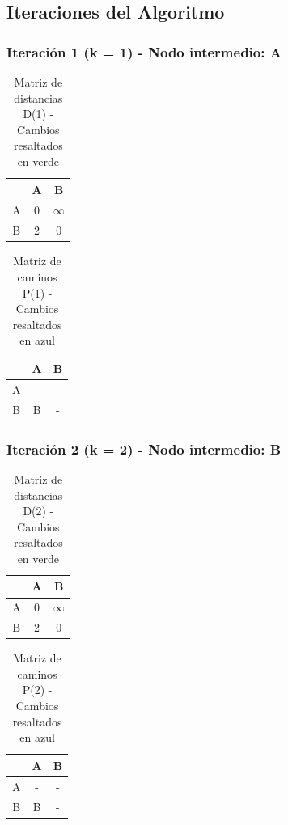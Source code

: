 \documentclass[12pt]{article}
\begin{document}
\clearpage
\subsection{Iteraciones del Algoritmo}
\subsubsection{Iteración 1 (k = 1) - Nodo intermedio: A}
\begin{table}[h!]
\centering
\begin{tabular}{|c|c|c|}
\hline
 & A & B \\\hline
A & 0 & $\infty$ \\\hline
B & 2 & 0 \\\hline
\end{tabular}
\caption{Matriz de distancias D(1) - Cambios resaltados en verde}
\end{table}

\begin{table}[h!]
\centering
\begin{tabular}{|c|c|c|}
\hline
 & A & B \\\hline
A & - & - \\\hline
B & B & - \\\hline
\end{tabular}
\caption{Matriz de caminos P(1) - Cambios resaltados en azul}
\end{table}

\subsubsection{Iteración 2 (k = 2) - Nodo intermedio: B}
\begin{table}[h!]
\centering
\begin{tabular}{|c|c|c|}
\hline
 & A & B \\\hline
A & 0 & $\infty$ \\\hline
B & 2 & 0 \\\hline
\end{tabular}
\caption{Matriz de distancias D(2) - Cambios resaltados en verde}
\end{table}

\begin{table}[h!]
\centering
\begin{tabular}{|c|c|c|}
\hline
 & A & B \\\hline
A & - & - \\\hline
B & B & - \\\hline
\end{tabular}
\caption{Matriz de caminos P(2) - Cambios resaltados en azul}
\end{table}
\end{document}
